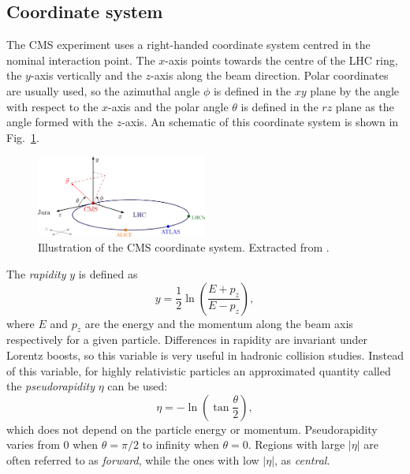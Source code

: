 \documentclass[../main.tex]{subfiles}
\begin{document}
\subsection{Coordinate system}

The CMS experiment uses a right-handed coordinate system centred in the nominal interaction point. The $x$-axis points towards the centre of the LHC ring, the $y$-axis vertically and the $z$-axis along the beam direction. Polar coordinates are usually used, so the azimuthal angle $\phi$ is defined in the $xy$ plane by the angle with respect to the $x$-axis and the polar angle $\theta$ is defined in the $rz$ plane as the angle formed with the $z$-axis. An schematic of this coordinate system is shown in Fig.~\ref{intro:exp:cms_coords}.

\begin{figure}[h!]
\begin{center}
\includegraphics[width=0.5\textwidth]{Images/axis3D_CMS-002}
\end{center}
\caption[CMS coordinate system]{Illustration of the CMS coordinate system. Extracted from \cite{intro:exp:cms_coord}.}
\label{intro:exp:cms_coords}
\end{figure}

The \textit{rapidity} $y$ is defined as
\begin{equation}
y = \frac{1}{2}\ln\left(\frac{E+p_z}{E-p_z}\right),
\end{equation}
where $E$ and $p_z$ are the energy and the momentum along the beam axis respectively for a given particle. Differences in rapidity are invariant under Lorentz boosts, so this variable is very useful in hadronic collision studies. Instead of this variable, for highly relativistic particles an approximated quantity called the \textit{pseudorapidity} $\eta$ can be used:
\begin{equation}
\eta = -\ln\left(\tan \frac{\theta}{2} \right),
\end{equation}
which does not depend on the particle energy or momentum. Pseudorapidity varies from 0 when $\theta=\pi/2$ to infinity when $\theta=0$. Regions with large $|\eta|$ are often referred to as \textit{forward}, while the ones with low $|\eta|$, as \textit{central}.
\end{document}
